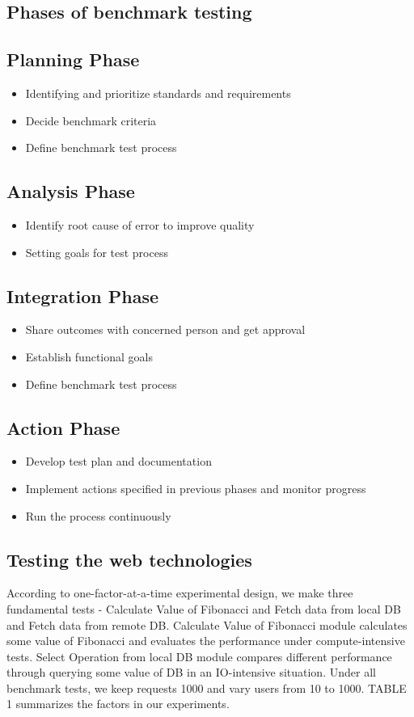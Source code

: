 \documentclass[../thesis.tex]{subfiles}
\begin{document}
\subsection{Phases of benchmark testing}
\subsection*{Planning Phase}
\begin{itemize}
	\item Identifying and prioritize standards and requirements
	\item Decide benchmark criteria
	\item Define benchmark test process
\end{itemize}
\subsection*{Analysis Phase}
\begin{itemize}
	\item Identify root cause of error to improve quality
	\item Setting goals for test process
\end{itemize}
\subsection*{Integration Phase}
\begin{itemize}
	\item Share outcomes with concerned person and get approval
	\item Establish functional goals
	\item Define benchmark test process
\end{itemize}
\subsection*{Action Phase}
\begin{itemize}
	\item Develop test plan and documentation
	\item Implement actions specified in previous phases and monitor progress
	\item Run the process continuously
\end{itemize}

\subsection{Testing the web technologies}
According to one-factor-at-a-time experimental design, we make three fundamental tests - Calculate Value of Fibonacci and Fetch data from local DB and Fetch data from remote DB. Calculate Value of Fibonacci module calculates some value of Fibonacci and evaluates the performance under compute-intensive tests. Select Operation from local DB module compares different performance through querying some value of DB in an IO-intensive situation. Under all benchmark tests, we keep requests 1000 and vary users from 10 to 1000. TABLE 1 summarizes the factors in our experiments.
\end{document}
